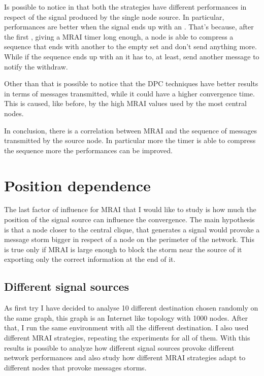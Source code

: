 Is possible to notice in  that
both the strategies have different performances in respect of the signal
produced by the single node source.
In particular, performances are better when the signal ends up with an .
That's because, after the first , giving a \ac{MRAI} timer long enough,
a node is able to compress a sequence that ends with another  to the
empty set and don't send anything more.
While if the sequence ends up with an  it has to, at least, send another
message to notify the withdraw.

Other than that is possible to notice that the \ac{DPC} techniques have better
results in terms of messages transmitted, while it could have a higher
convergence time.
This is caused, like before, by the high \ac{MRAI} values used by the most
central nodes.

In conclusion, there is a correlation between \ac{MRAI} and the sequence of messages
transmitted by the source node.
In particular more the timer is able to compress the sequence more the performances
can be improved.

\section{Position dependence}
\label{sec:position_dependance}

The last factor of influence for \ac{MRAI} that I would like to study is how much
the position of the signal source can influence the convergence.
The main hypothesis is that a node closer to the central clique, that generates
a signal would provoke a message storm bigger in respect of a node on the perimeter
of the network.
This is true only if \ac{MRAI} is large enough to block the storm near the source
of it exporting only the correct information at the end of it.

\subsection{Different signal sources}
\label{subsec:different_destinations}

As first try I have decided to analyse \num{10} different destination chosen randomly
on the same graph, this graph is an Internet like topology with \num{1000} nodes.
After that, I run the same environment with all the different destination.
I also used different \ac{MRAI} strategies, repeating the experiments for all of
them.
With this results is possible to analyze how different signal sources provoke
different network performances and also study how different \ac{MRAI} strategies
adapt to different nodes that provoke messages storms.

